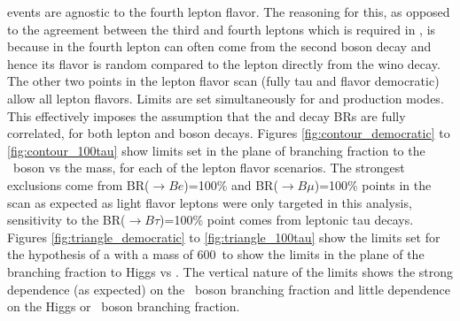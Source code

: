 \SRFour events are agnostic to the fourth lepton flavor. 
The reasoning for this, as opposed to the agreement between the third and fourth leptons which is required in \SRFR, is because in \SRFour the fourth lepton can often come from the second boson decay and hence its flavor is random compared to the lepton directly from the wino decay.
The other two points in the lepton flavor scan (fully tau and flavor democratic) allow all lepton flavors.
Limits are set simultaneously for \CCsignal and \CNsignal production modes.
This effectively imposes the assumption that the \chone and \none decay BRs are fully correlated, for both lepton and boson decays.
Figures \ref{fig:contour_democratic} to \ref{fig:contour_100tau} show limits set in the plane of \chono branching fraction to the \Zboson\ boson vs the \chono mass, for each of the lepton flavor scenarios. 
The strongest exclusions come from BR(\wino$\rightarrow$\(Be\))=100\% and BR(\wino$\rightarrow$\(B\mu\))=100\% points in the scan as expected as light flavor leptons were only targeted in this analysis, sensitivity to the BR(\wino$\rightarrow$\(B\tau\))=100\% point comes from leptonic tau decays.  
Figures \ref{fig:triangle_democratic} to \ref{fig:triangle_100tau} show the limits set for the hypothesis of a \chono with a mass of 600~\GeV to show the limits in the plane of the \chono branching fraction to Higgs vs \Zboson.  
The vertical nature of the limits shows the strong dependence (as expected) on the \Zboson\ boson branching fraction and little dependence on the Higgs or \Wboson\ boson branching fraction.
